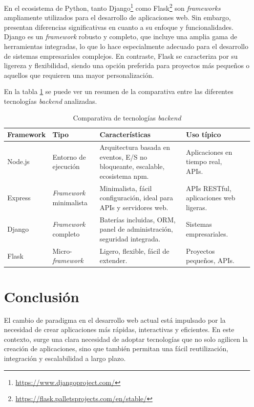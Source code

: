 En el ecosistema de Python, tanto Django\footnote{\url{https://www.djangoproject.com/}} como Flask\footnote{\url{https://flask.palletsprojects.com/en/stable/}} son \textit{frameworks} ampliamente utilizados para el desarrollo de aplicaciones web. Sin embargo, presentan diferencias significativas en cuanto a su enfoque y funcionalidades. Django es un \textit{framework} robusto y completo, que incluye una amplia gama de herramientas integradas, lo que lo hace especialmente adecuado para el desarrollo de sistemas empresariales complejos. En contraste, Flask se caracteriza por su ligereza y flexibilidad, siendo una opción preferida para proyectos más pequeños o aquellos que requieren una mayor personalización.

En la tabla \ref{tab:backend_technologies} se puede ver un resumen de la comparativa entre las diferentes tecnologías \textit{backend} analizadas.

\begin{table}[h!]
\centering
\small
\begin{tabularx}{\textwidth}{X X X p{4.5cm} p{3cm}}
\toprule
\textbf{Framework} & \textbf{Tipo} & \textbf{Características} & \textbf{Uso típico} \\
\midrule
Node.js & Entorno de ejecución & Arquitectura basada en eventos, E/S no bloqueante, escalable, ecosistema npm. & Aplicaciones en tiempo real, APIs. \\
\midrule
Express & \textit{Framework} minimalista & Minimalista, fácil configuración, ideal para APIs y servidores web. & APIs RESTful, aplicaciones web ligeras. \\
\midrule
Django & \textit{Framework} completo & Baterías incluidas, ORM, panel de administración, seguridad integrada. & Sistemas empresariales. \\
\midrule
Flask & Micro-\textit{framework} & Ligero, flexible, fácil de extender. & Proyectos pequeños, APIs. \\
\bottomrule
\end{tabularx}
\caption{Comparativa de tecnologías \textit{backend}}
\label{tab:backend_technologies}
\end{table}

\section{Conclusión}

El cambio de paradigma en el desarrollo web actual está impulsado por la necesidad de crear aplicaciones más rápidas, interactivas y eficientes. En este contexto, surge una clara necesidad de adoptar tecnologías que no solo agilicen la creación de aplicaciones, sino que también permitan una fácil reutilización, integración y escalabilidad a largo plazo.

